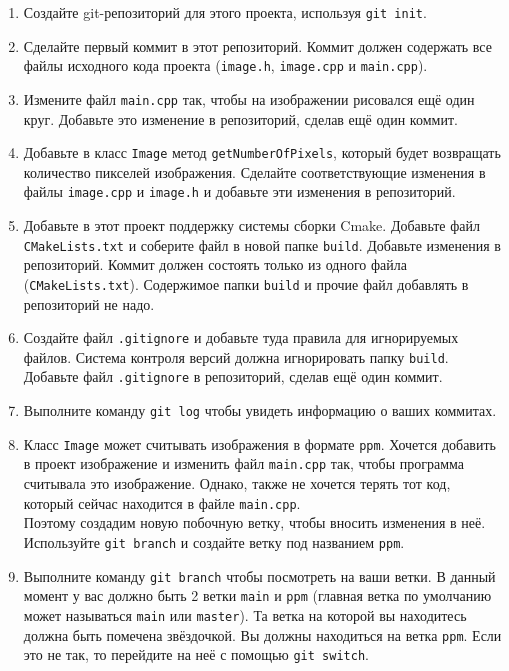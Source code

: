 \documentclass{article}
\begin{document}
\begin{enumerate}
\item Создайте git-репозиторий для этого проекта, используя \texttt{git init}.
\item Сделайте первый коммит в этот репозиторий. Коммит должен содержать все файлы исходного кода проекта (\texttt{image.h}, \texttt{image.cpp} и \texttt{main.cpp}).
\item Измените файл \texttt{main.cpp} так, чтобы на изображении рисовался ещё один круг. Добавьте это изменение в репозиторий, сделав ещё один коммит.
\item Добавьте в класс \texttt{Image} метод \texttt{getNumberOfPixels}, который будет возвращать количество пикселей изображения. Сделайте соответствующие изменения в файлы \texttt{image.cpp} и \texttt{image.h} и добавьте эти изменения в репозиторий.
\item Добавьте в этот проект поддержку системы сборки Cmake. Добавьте файл \texttt{CMakeLists.txt} и соберите файл в новой папке \texttt{build}. Добавьте изменения в репозиторий. Коммит должен состоять только из одного файла (\texttt{CMakeLists.txt}). Содержимое папки \texttt{build} и прочие файл добавлять в репозиторий не надо.
\item Создайте файл \texttt{.gitignore} и добавьте туда правила для игнорируемых файлов. Система контроля версий должна игнорировать папку \texttt{build}. Добавьте файл \texttt{.gitignore} в репозиторий, сделав ещё один коммит.
\item Выполните команду \texttt{git log} чтобы увидеть информацию о ваших коммитах.

\item Класс \texttt{Image} может считывать изображения в формате \texttt{ppm}. Хочется добавить в проект изображение и изменить файл \texttt{main.cpp} так, чтобы программа считывала это изображение. Однако, также не хочется терять тот код, который сейчас находится в файле \texttt{main.cpp}. \\
Поэтому создадим новую побочную ветку, чтобы вносить изменения в неё. Используйте \texttt{git branch} и создайте ветку под названием \texttt{ppm}. 

\item Выполните команду \texttt{git branch} чтобы посмотреть на ваши ветки. В данный момент у вас должно быть 2 ветки \texttt{main} и \texttt{ppm} (главная ветка по умолчанию может называться \texttt{main} или \texttt{master}). Та ветка на которой вы находитесь должна быть помечена звёздочкой. Вы должны находиться на ветка \texttt{ppm}. Если это не так, то перейдите на неё с помощью \texttt{git switch}.


\end{enumerate}
\end{document}
